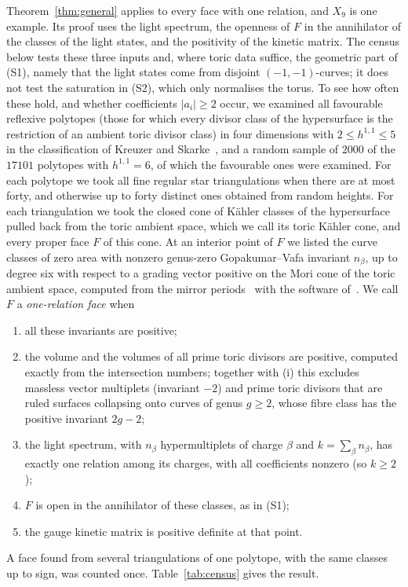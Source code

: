Theorem~\ref{thm:general} applies to every face with one relation, and $X_9$ is one example. Its proof uses
the light spectrum, the openness of $F$ in the annihilator of the classes of the light states, and the
positivity of the kinetic matrix. The census below tests these three inputs and, where toric data suffice,
the geometric part of (S1), namely that the light states come from disjoint $(-1,-1)$-curves; it does not
test the saturation in (S2), which only normalises the
torus. To see how often these hold, and whether coefficients $|a_i|\geq2$ occur,
we examined all favourable reflexive polytopes (those for which every divisor class of the hypersurface
is the restriction of an ambient toric divisor class) in four dimensions with $2\leq h^{1,1}\leq5$ in the
classification of Kreuzer and Skarke~\cite{Kreuzer:2000}, and a random sample of $2000$ of the $17101$
polytopes with $h^{1,1}=6$, of which the favourable ones were examined. For each polytope we took all fine regular star triangulations when there are
at most forty, and otherwise up to forty distinct ones obtained from random heights. For each triangulation we took the
closed cone of K\"ahler classes of the hypersurface pulled back from the toric ambient space, which we call
its toric K\"ahler cone, and every proper face $F$ of this cone. At an interior point of $F$ we listed the
curve classes of zero area with nonzero genus-zero Gopakumar--Vafa invariant $n_\beta$, up to degree six
with respect to a grading vector positive on the Mori cone of the toric ambient space, computed from the mirror
periods~\cite{Demirtas:2024Mirror} with the software of~\cite{Demirtas:2022cytools}. We call $F$ a \emph{one-relation face} when
\begin{enumerate}
\item[(i)] all these invariants are positive;
\item[(ii)] the volume and the volumes of all prime toric divisors are positive, computed exactly from the
 intersection numbers; together with (i) this excludes massless vector multiplets (invariant $-2$) and
 prime toric divisors that are ruled surfaces collapsing onto curves of genus $g\geq2$, whose fibre class
 has the positive invariant $2g-2$;
\item[(iii)] the light spectrum, with $n_\beta$ hypermultiplets of charge $\beta$ and $k=\sum_\beta n_\beta$,
 has exactly one relation among its charges, with all coefficients nonzero (so $k\geq2$);
\item[(iv)] $F$ is open in the annihilator of these classes, as in (S1);
\item[(v)] the gauge kinetic matrix is positive definite at that point.
\end{enumerate}
A face found from several triangulations of one polytope, with the same classes up to sign, was counted
once. Table~\ref{tab:census} gives the result.

